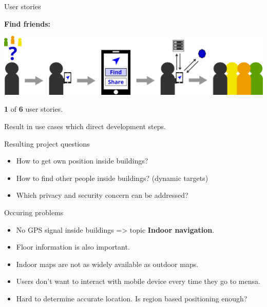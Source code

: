 \documentclass[9pt]{beamer}
\begin{document}
\begin{frame}{User stories}

	\textbf{Find friends:}
	
	\vspace{0.2cm}

	\begin{center}
	
		\includegraphics[width=\textwidth]{user-story}
	
	\end{center}
	
	\vspace{1cm}
	
	\textbf{1} of \textbf{6} user stories.
	
	Result in use cases which direct development steps.

\end{frame}

\begin{frame}{Resulting project questions}

	\begin{itemize}
	
		\item How to get own position inside buildings?
		\item How to find other people inside buildings? (dynamic targets) 
		\item Which privacy and security concern can be addressed?
	
	\end{itemize}

\end{frame}

\begin{frame}{Occuring problems}

	\begin{itemize}
	
		\item No GPS signal inside buildings => topic \textbf{Indoor navigation}.
		\item Floor information is also important.
		\item Indoor maps are not as widely available as outdoor maps.		
		\item Users don't want to interact with mobile device every time they go to mensa. 		
		\item Hard to determine accurate location. Is region based positioning enough?
	
	\end{itemize}

\end{frame}
\end{document}

